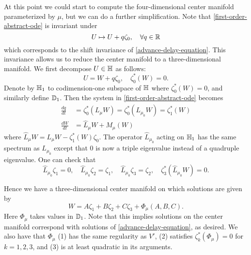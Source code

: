 At this point we could start to compute the four-dimensional center manifold parameterized by \(\mu\), but we can do a further simplification. Note that \cref{first-order-abstract-ode} is invariant under 
\begin{equation}
	U \mapsto U + q \zeta_0, \quad \forall q \in \mathbb{R}
\end{equation}
which corresponds to the shift invariance of \cref{advance-delay-equation}. This invariance allows us to reduce the center manifold to a three-dimensional manifold. We first decompose \(U \in \mathbb{H}\) as follows:
\begin{equation}
	U = W + q \zeta_0, \quad \zeta_0^*(W) = 0.
\end{equation}
Denote by \(\mathbb{H}_1\) to codimension-one subspace of \(\mathbb{H}\) where \(\zeta_0^*(W) = 0\), and similarly define \(\mathbb{D}_1\). Then the system in \cref{first-order-abstract-ode} becomes
\begin{align}
	\frac{dq}{dt} &= \zeta_0^*(L_{\mu} W) = \zeta_0^*(L_{\mu_0} W) = \zeta_1^*(W) \label{ode-for-q} \\
	\frac{d W}{dt} &= \widehat{L}_\mu W + M_\mu(W) \label{reduced-first-order-system}
\end{align}
where \(\widehat{L}_\mu W = L_\mu W - \zeta_1^*(W)\zeta_0\). The operator \(\widehat L_{\mu_0}\) acting on \(\mathbb{H}_1\) has the same spectrum as \(L_{\mu_0}\) except that \(0\) is now a triple eigenvalue instead of a quadruple eigenvalue. One can check that
\begin{equation}\label{reduced-eigenfunction}
	\widehat{L}_{\mu_0} \zeta_1 = 0, \quad \widehat{L}_{\mu_0}\zeta_2 = \zeta_1, \quad \widehat{L}_{\mu_0}\zeta_3 = \zeta_2, \quad \zeta_3^*(\widehat{L}_{\mu_0}W) = 0.
\end{equation}

Hence we have a three-dimensional center manifold on which solutions are given by
\begin{equation}\label{W-center-manifold}
	W = A \zeta_1 + B\zeta_2 + C\zeta_3 +\Phi_\mu(A,B,C).
\end{equation}
Here \(\Phi_\mu\) takes values in \(\mathbb{D}_1\). Note that this implies solutions on the center manifold correspond with solutions of \cref{advance-delay-equation}, as desired. We also have that \(\Phi_\mu\) (1) has the same regularity as \(V'\), (2) satisfies \(\zeta_k^*(\Phi_\mu) = 0\) for \(k=1,2,3\),  and (3) is at least quadratic in its arguments.

